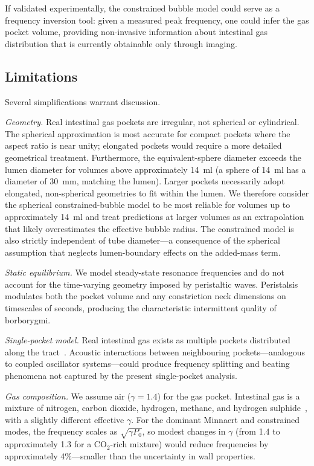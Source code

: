 \documentclass[12pt]{article}
\begin{document}
If validated experimentally, the constrained bubble model could serve as a
frequency inversion tool: given a measured peak frequency, one could infer
the gas pocket volume, providing non-invasive information about intestinal
gas distribution that is currently obtainable only through imaging.

\subsection{Limitations}
\label{sec:limitations}

Several simplifications warrant discussion.

\emph{Geometry.}  Real intestinal gas pockets are irregular, not spherical
or cylindrical.  The spherical approximation is most accurate for compact
pockets where the aspect ratio is near unity; elongated pockets would
require a more detailed geometrical treatment.  Furthermore, the
equivalent-sphere diameter exceeds the lumen diameter for volumes above
approximately \SI{14}{\milli\litre} (a sphere of \SI{14}{\milli\litre}
has a diameter of \SI{30}{\milli\metre}, matching the lumen).  Larger
pockets necessarily adopt elongated, non-spherical geometries to fit
within the lumen.  We therefore consider the spherical constrained-bubble
model to be most reliable for volumes up to approximately
\SI{14}{\milli\litre} and treat predictions at larger volumes as an
extrapolation that likely overestimates the effective bubble radius.
The constrained model is also strictly independent of tube diameter---a
consequence of the spherical assumption that neglects lumen-boundary
effects on the added-mass term.

\emph{Static equilibrium.}  We model steady-state resonance frequencies and
do not account for the time-varying geometry imposed by peristaltic waves.
Peristalsis modulates both the pocket volume and any constriction neck
dimensions on timescales of seconds, producing the characteristic intermittent
quality of borborygmi.

\emph{Single-pocket model.}  Real intestinal gas exists as multiple pockets
distributed along the tract~\cite{Serra2001, Levitt1971}.  Acoustic
interactions between neighbouring pockets---analogous to coupled oscillator
systems---could produce frequency splitting and beating phenomena not captured
by the present single-pocket analysis.

\emph{Gas composition.}  We assume air ($\gamma = 1.4$) for the gas pocket.
Intestinal gas is a mixture of nitrogen, carbon dioxide, hydrogen, methane,
and hydrogen sulphide~\cite{Suarez1997, Levitt1971}, with a slightly different
effective $\gamma$.  For the dominant Minnaert and constrained modes, the
frequency scales as $\sqrt{\gamma P_0}$, so modest changes in $\gamma$ (from
1.4 to approximately 1.3 for a CO$_2$-rich mixture) would reduce frequencies
by approximately 4\%---smaller than the uncertainty in wall properties.
\end{document}

